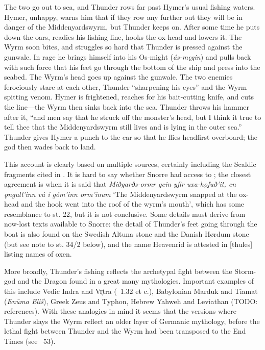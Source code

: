 {The two go out to sea, and Thunder rows far past Hymer’s usual fishing waters.  Hymer, unhappy, warns him that if they row any further out they will be in danger of the Middenyardswyrm, but Thunder keeps on.  After some time he puts down the oars, readies his fishing line, hooks the ox-head and lowers it.  The Wyrm soon bites, and struggles so hard that Thunder is pressed against the gunwale.  In rage he brings himself into his Os-might (\emph{ás-męgin}) and pulls back with such force that his feet go through the bottom of the ship and press into the seabed.  The Wyrm's head goes up against the gunwale.  The two enemies ferociously stare at each other, Thunder “sharpening his eyes” and the Wyrm spitting venom.  Hymer is frightened, reaches for his bait-cutting knife, and cuts the line—the Wyrm then sinks back into the sea.  Thunder throws his hammer after it, “and men say that he struck off the monster’s head, but I think it true to tell thee that the Middenyardswyrm still lives and is lying in the outer sea.”  Thunder gives Hymer a punch to the ear so that he flies headfirst overboard; the god then wades back to land.

This account is clearly based on multiple sources, certainly including the Scaldic fragments cited in \Skaldskaparmal.  It is hard to say whether Snorre had access to \Hymiskvida; the closest agreement is when it is said that \emph{Miðgarðs-ormr gein yfir uxa-hǫfuð’it, en ǫngull’inn vá í góm’inn orm’inum} ‘The Middenyardswyrm snapped at the ox-head and the hook went into the roof of the wyrm’s mouth’, which has some resemblance to st. 22, but it is not conclusive.  Some details must derive from now-lost texts available to Snorre: the detail of Thunder’s feet going through the boat is also found on the Swedish Altuna stone and the Danish Hørdum stone (but see note to st. 34/2 below), and the name Heavenrid is attested in [thules] listing names of oxen.

More broadly, Thunder’s fishing reflects the archetypal fight between the Storm-god and the Dragon found in a great many mythologies.  Important examples of this include Vedic Indra and Vr̥tra (\Rigveda\ 1.32 et c.), Babylonian Marduk and Tiamat (\emph{Enūma Eliš}), Greek Zeus and Typhon, Hebrew Yahweh and Leviathan (TODO: references).  With these analogies in mind it seems that the versions where Thunder slays the Wyrm reflect an older layer of Germanic mythology, before the lethal fight between Thunder and the Wyrm had been transposed to the End Times (see \Voluspa\ 53).}

